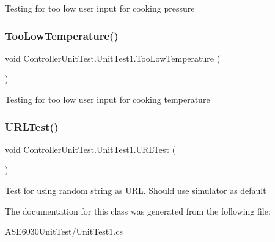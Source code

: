 Testing for too low user input for cooking pressure 

\mbox{\label{class_controller_unit_test_1_1_unit_test1_a7bdcd66725dc66a60616781b47d4cf11}} 
\subsubsection{\texorpdfstring{Too\+Low\+Temperature()}{TooLowTemperature()}}
{\footnotesize\ttfamily void Controller\+Unit\+Test.\+Unit\+Test1.\+Too\+Low\+Temperature (\begin{DoxyParamCaption}{ }\end{DoxyParamCaption})\hspace{0.3cm}{\ttfamily [inline]}}



Testing for too low user input for cooking temperature 

\mbox{\label{class_controller_unit_test_1_1_unit_test1_abc3e4821a5f8e5b0555298e835fec144}} 
\subsubsection{\texorpdfstring{U\+R\+L\+Test()}{URLTest()}}
{\footnotesize\ttfamily void Controller\+Unit\+Test.\+Unit\+Test1.\+U\+R\+L\+Test (\begin{DoxyParamCaption}{ }\end{DoxyParamCaption})\hspace{0.3cm}{\ttfamily [inline]}}



Test for using random string as U\+RL. Should use simulator as default 



The documentation for this class was generated from the following file\+:\begin{DoxyCompactItemize}
\item 
A\+S\+E6030\+Unit\+Test/Unit\+Test1.\+cs\end{DoxyCompactItemize}
